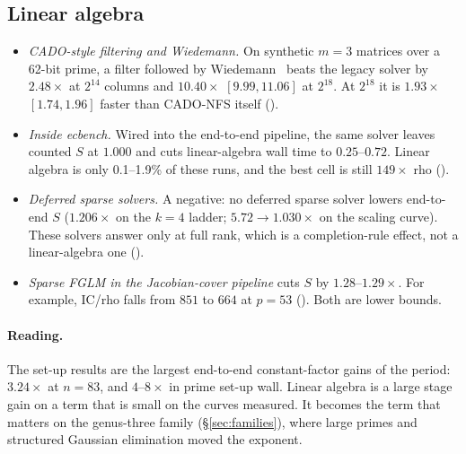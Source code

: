 \subsection{Linear algebra}

\begin{itemize}
\item \emph{CADO-style filtering and Wiedemann.} On synthetic $m=3$
  matrices over a 62-bit prime, a filter followed by
  Wiedemann~\cite{wiedemann1986} beats the legacy solver by $2.48\times$
  at $2^{14}$ columns and $10.40\times$ $[9.99,11.06]$ at $2^{18}$. At
  $2^{18}$ it is $1.93\times$ $[1.74,1.96]$ faster than CADO-NFS itself
  ().
\item \emph{Inside ecbench.} Wired into the end-to-end pipeline, the same
  solver leaves counted $S$ at $1.000$ and cuts linear-algebra wall time
  to $0.25$--$0.72$. Linear algebra is only 0.1--1.9\% of these runs, and
  the best cell is still $149\times$ rho
  ().
\item \emph{Deferred sparse solvers.} A negative: no deferred sparse
  solver lowers end-to-end $S$ ($1.206\times$ on the $k=4$ ladder;
  $5.72\to1.030\times$ on the scaling curve). These solvers answer only at
  full rank, which is a completion-rule effect, not a linear-algebra one
  ().
\item \emph{Sparse FGLM in the Jacobian-cover pipeline} cuts $S$ by
  $1.28$--$1.29\times$. For example, IC/rho falls from $851$ to $664$ at
  $p=53$ (). Both are lower
  bounds.
\end{itemize}

\paragraph{Reading.} The set-up results are the largest end-to-end
constant-factor gains of the period: $3.24\times$ at $n=83$, and $4$--$8\times$
in prime set-up wall. Linear algebra is a large stage gain on a term that
is small on the curves measured. It becomes the term that matters on the
genus-three family (\S\ref{sec:families}), where large primes and
structured Gaussian elimination moved the exponent.
